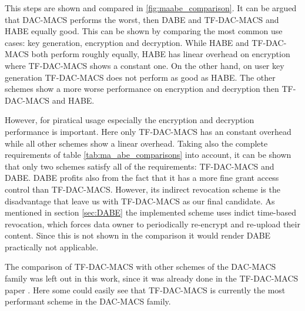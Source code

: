 This steps are shown and compared in \ref{fig:maabe_comparison}. It can be argued that \ac{DAC-MACS} performs the worst, then \ac{DABE} and \ac{TF-DAC-MACS} and \ac{HABE} equally good. This can be shown by comparing the most common use cases: key generation, encryption and decryption. While HABE and TF-DAC-MACS both perform roughly equally, HABE has linear overhead on encryption where TF-DAC-MACS shows a constant one. On the other hand, on user key generation TF-DAC-MACS does not perform as good as HABE. The other schemes show a more worse performance on encryption and decryption then TF-DAC-MACS and HABE. 

However, for piratical usage especially the encryption and decryption performance is important. Here only \ac{TF-DAC-MACS} has an constant overhead while all other schemes show a linear overhead. Taking also the complete requirements of table \ref{tab:ma_abe_comparisons} into account, it can be shown that only two schemes satisfy all of the requirements: \ac{TF-DAC-MACS} and \ac{DABE}. \ac{DABE} profits also from the fact that it has a more fine grant access control than \ac{TF-DAC-MACS}. However, its indirect revocation scheme is the disadvantage that leave us with \ac{TF-DAC-MACS} as our final candidate. As mentioned in section \ref{sec:DABE} the implemented scheme uses indict time-based revocation, which forces data owner to periodically re-encrypt and re-upload their content. Since this is not shown in the comparison it would render DABE practically not applicable.

The comparison of \ac{TF-DAC-MACS} with other schemes of the \ac{DAC-MACS} family was left out in this work, since it was already done in the \ac{TF-DAC-MACS} paper \cite{li2017two}. Here some could easily see that \ac{TF-DAC-MACS} is currently the most performant scheme in the \ac{DAC-MACS} family.  